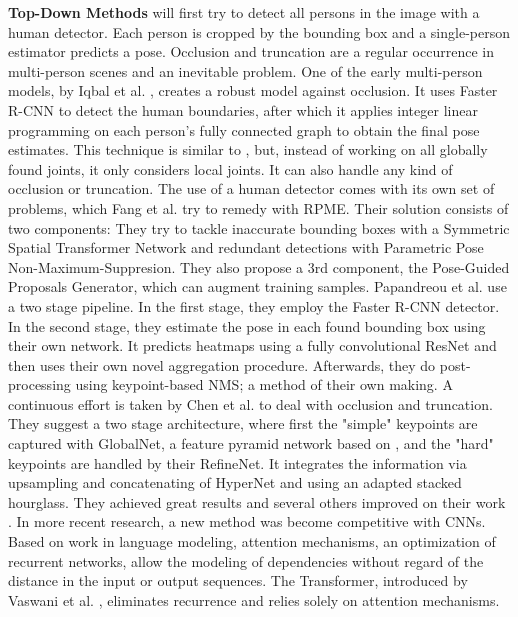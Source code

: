 \textbf{Top-Down Methods} will first try to detect all persons in the image with a human detector.
Each person is cropped by the bounding box and a single-person estimator predicts a pose.
Occlusion and truncation are a regular occurrence in multi-person scenes and an inevitable problem.
One of the early multi-person models, by Iqbal et al. \cite{Iqbal2016}, creates a robust model against occlusion.
It uses \gls{Faster R-CNN} \cite{Ren2015} to detect the human boundaries, after which it applies integer linear programming on each person's fully connected graph to obtain the final pose estimates.
This technique is similar to \cite{Pishchulin2015}, but, instead of working on all globally found joints, it only considers local joints.
It can also handle any kind of occlusion or truncation.
The use of a human detector comes with its own set of problems, which Fang et al. \cite{Fang2016} try to remedy with \gls{RPME}.
Their solution consists of two components:
They try to tackle inaccurate bounding boxes with a Symmetric Spatial Transformer Network and redundant detections with Parametric Pose Non-Maximum-Suppresion.
They also propose a 3rd component, the Pose-Guided Proposals Generator, which can augment training samples.
Papandreou et al. \cite{Papandreou2017} use a two stage pipeline.
In the first stage, they employ the Faster R-CNN detector.
In the second stage, they estimate the pose in each found bounding box using their own network.
It predicts heatmaps using a fully convolutional \gls{ResNet} and then uses their own novel aggregation procedure.
Afterwards, they do post-processing using keypoint-based \gls{NMS}; a method of their own making.
A continuous effort is taken by Chen et al. \cite{Chen2017a} to deal with occlusion and truncation.
They suggest a two stage architecture, where first the "simple" keypoints are captured with GlobalNet, a feature pyramid network based on \cite{Lin2016}, and the "hard" keypoints are handled by their RefineNet.
It integrates the information via upsampling and concatenating of HyperNet \cite{Kong2016} and using an adapted stacked hourglass.
They achieved great results and several others improved on their work \cite{Su2019, Li2019a}.
In more recent research, a new method was become competitive with \glspl{CNN}.
Based on work in language modeling, attention mechanisms, an optimization of recurrent networks, allow the modeling of dependencies without regard of the distance in the input or output sequences.
The Transformer, introduced by Vaswani et al. \cite{Vaswani2017}, eliminates recurrence and relies solely on attention mechanisms.
